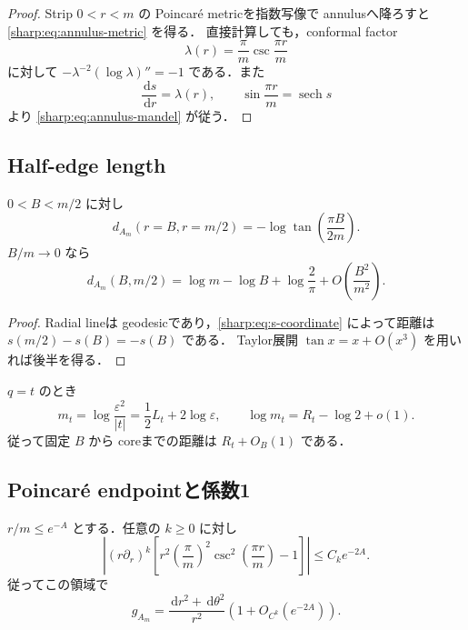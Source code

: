 \documentclass[a4paper,11pt]{ltjsarticle}
\numberwithin{equation}{section}
\theoremstyle{plain}
\theoremstyle{definition}
\theoremstyle{remark}
\newcommand{\eps}{\varepsilon}\newcommand{\dd}{\,\mathrm d}\newcommand{\ddc}{\sqrt{-1}\,\partial\bar\partial}
\begin{document}
\begin{proof}
Strip $0<r<m$ の Poincaré metricを指数写像で annulusへ降ろすと \eqref{sharp:eq:annulus-metric} を得る．
直接計算しても，conformal factor
\[
 \lambda(r)=\frac{\pi}{m}\csc\frac{\pi r}{m}
\]
に対して $-\lambda^{-2}(\log\lambda)''=-1$ である．また
\[
 \frac{\dd s}{\dd r}=\lambda(r),\qquad
 \sin\frac{\pi r}{m}=\operatorname{sech}s
\]
より \eqref{sharp:eq:annulus-mandel} が従う．
\end{proof}

\subsection{Half-edge length}

\begin{proposition}\label{sharp:prop:half-length}
$0<B<m/2$ に対し
\begin{equation}\label{sharp:eq:half-length-exact}
 d_{A_m}(r=B,r=m/2)
 =-\log\tan\left(\frac{\pi B}{2m}\right).
\end{equation}
$B/m\to0$ なら
\begin{equation}\label{sharp:eq:half-length-asymptotic}
 d_{A_m}(B,m/2)
 =\log m-\log B+\log\frac{2}{\pi}
  +O\left(\frac{B^2}{m^2}\right).
\end{equation}
\end{proposition}

\begin{proof}
Radial lineは geodesicであり，\eqref{sharp:eq:s-coordinate} によって距離は $s(m/2)-s(B)=-s(B)$ である．
Taylor展開 $\tan x=x+O(x^3)$ を用いれば後半を得る．
\end{proof}

$q=t$ のとき
\begin{equation}\label{sharp:eq:m-vs-L}
 m_t=\log\frac{\eps^2}{|t|}=\frac12L_t+2\log\eps,
 \qquad \log m_t=R_t-\log2+o(1).
\end{equation}
従って固定 $B$ から coreまでの距離は $R_t+O_B(1)$ である．

\subsection{Poincaré endpointと係数1}

\begin{lemma}\label{sharp:lem:endpoint-expansion}
$r/m\le e^{-A}$ とする．任意の $k\ge0$ に対し
\begin{equation}\label{sharp:eq:endpoint-expansion}
 \left|(r\partial_r)^k\left[
 r^2\left(\frac{\pi}{m}\right)^2
 \csc^2\left(\frac{\pi r}{m}\right)-1\right]\right|
 \le C_k e^{-2A}.
\end{equation}
従ってこの領域で
\[
 g_{A_m}=\frac{\dd r^2+\dd\theta^2}{r^2}
 \left(1+O_{C^k}(e^{-2A})\right).
\]
\end{lemma}
\end{document}

